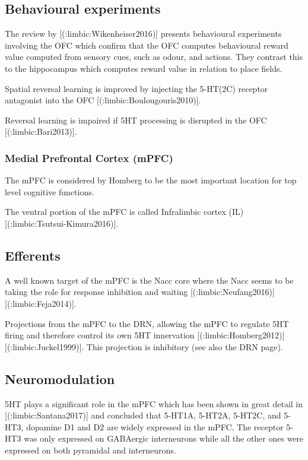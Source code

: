 {{\subsection{Behavioural experiments}

The review by [(:limbic:Wikenheiser2016)] presents behavioural experiments involving the OFC which confirm that the OFC computes behavioural reward value computed from sensory cues, such as odour, and actions. They contrast this to the hippocampus which computes reward value in relation to place fields.

Spatial reversal learning is improved by injecting the 5-HT(2C) receptor antagonist into the OFC [(:limbic:Boulougouris2010)]. 

Reversal learning is impaired if 5HT processing is disrupted in the OFC [(:limbic:Bari2013)].

\subsubsection{Medial Prefrontal Cortex (mPFC)}

The mPFC is considered by Homberg to be the most important location for top level cognitive
functions. 

The ventral portion of the mPFC is called Infralimbic cortex (IL) [(:limbic:Tsutsui-Kimura2016)].

\subsection{Efferents}

A well known target of the mPFC is the Nacc core where the Nacc seems to be taking the role for response inhibition and waiting [(:limbic:Neufang2016)] [(:limbic:Feja2014)].

Projections from the mPFC to the DRN, allowing the mPFC to regulate 5HT firing and therefore control its own 5HT innervation  [(:limbic:Homberg2012)][(:limbic:Juckel1999)]. This projection is inhibitory (see also the DRN page).

\subsection{Neuromodulation}

5HT plays a significant role in the mPFC which has been shown in great detail in [(:limbic:Santana2017)] and concluded that 5-HT1A, 5-HT2A, 5-HT2C, and 5-HT3, 
dopamine D1 and D2 are widely expressed in the mPFC. The receptor 5-HT3 was only expressed on GABAergic interneurons while all the other ones were expressed on both pyramidal and interneurons.


}}
